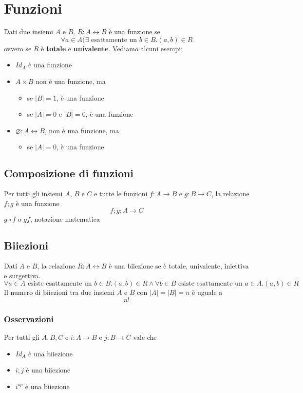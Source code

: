 \documentclass{article}
\begin{document}
\pagebreak

\section{Funzioni}
Dati due insiemi \(A\) e \(B\), \(R: A \leftrightarrow B\) è una funzione se
\[\forall a \in A (\exists \text{ esattamente un } b \in B . (a,b) \in R\]
ovvero se \(R\) è \textbf{totale} e \textbf{univalente}. Vediamo alcuni esempi:
\begin{itemize}
    \item \(Id_A\) è una funzione
    \item \(A \times B\) non è una funzione, ma
          \begin{itemize}
              \item se \(\lvert B \rvert = 1\), è una funzione
              \item se \(\lvert A \rvert = 0\) e \(\lvert B \rvert = 0\), è una funzione
          \end{itemize}
    \item \(\varnothing: A \leftrightarrow B\), non è una funzione, ma
          \begin{itemize}
              \item se \(\lvert A \rvert = 0\), è una funzione
          \end{itemize}
\end{itemize}

\subsection{Composizione di funzioni}
Per tutti gli insiemi \(A\), \(B\) e \(C\) e tutte le funzioni \(f: A \rightarrow B\) e \(g: B \rightarrow C\), la relazione \(f;g\) è una funzione
\[f;g: A \rightarrow C\]
\(g \circ f\) o \(gf\), notazione matematica

\subsection{Biiezioni}
Dati \(A\) e \(B\), la relazione \(R: A \leftrightarrow B\) è una biiezione se è totale, univalente, iniettiva e surgettiva.
\[\forall a \in A \text{ esiste esattamente un } b \in B . (a,b) \in R \land \forall b \in B \text{ esiste esattamente un } a \in A . (a,b) \in R\]
Il numero di biiezioni tra due insiemi \(A\) e \(B\) con \(\lvert A \rvert = \lvert B \rvert = n\) è uguale a
\[n!\]

\subsubsection{Osservazioni}
Per tutti gli \(A,B,C\) e \(i: A \rightarrow B\) e \(j: B \rightarrow C\) vale che
\begin{itemize}
    \item \(Id_A\) è una biiezione
    \item \(i;j\) è una biiezione
    \item \(i^{op}\) è una biiezione
\end{itemize}
\end{document}
